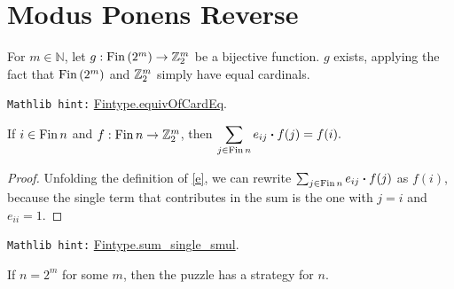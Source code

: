\section{Modus Ponens Reverse}

\bigskip

\begin{definition}
\label{bij_Fin}
\leanok
For $m\in\mathbb{N}$, let $g : \mathrm{Fin}\, (2^m) \to \mathbb{Z}_2^m$ be a bijective function. $g$ exists, {\B applying} the fact that $\mathrm{Fin}\, (2^m)$ and $\mathbb{Z}_2^m$ {\B simply} have {\B equal cardinals}.
\end{definition}

\verb|Mathlib hint:| \href{https://leanprover-community.github.io/mathlib4_docs/Mathlib/Data/Fintype/EquivFin.html#Fintype.equivOfCardEq}{Fintype.equivOfCardEq}.

\bigskip

\begin{lemma}
\label{sum_basis}
\leanok
If $i \in \mathrm{Fin}\, n$ and $f : \mathrm{Fin}\, n \to \mathbb{Z}_2^m$, then $\displaystyle\sum_{j \in \mathrm{Fin}\, n} e_{ij} \boldsymbol{\cdot} f(j) = f(i).$
\end{lemma}

\begin{proof}
  \leanok
{\B Unfolding} the definition of \eqref{e}, we can {\B rewrite}  $\sum_{j \in \mathrm{Fin}\, n} e_{ij} \boldsymbol{\cdot} f(j)$ as $f(i)$, because the {\B single} term that contributes in the {\B sum} is the one with $j = i$ and $e_{ii} = 1$.
\end{proof}

\verb|Mathlib hint:| \href{https://leanprover-community.github.io/mathlib4_docs/Mathlib/Algebra/Module/BigOperators.html#Fintype.sum_single_smul}{Fintype.sum\_single\_smul}.

\bigskip

\begin{theorem}
\label{puzzle_mpr}
\leanok
If $n = 2^m$ for some $m$, then the puzzle has a strategy for $n$.
\end{theorem}

